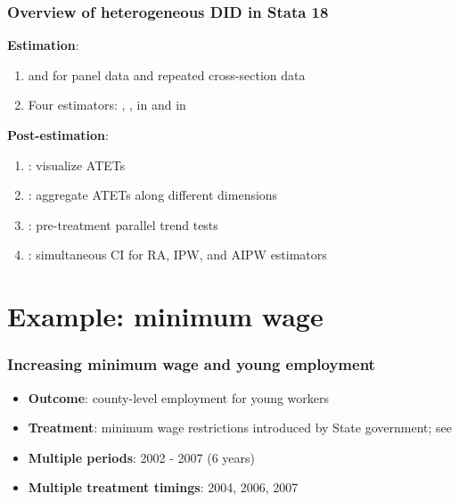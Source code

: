 \documentclass[11pt]{beamer}
\begin{document}
\begin{frame}
  \frametitle{Overview of heterogeneous DID in Stata 18}
{\bf Estimation}:
\begin{enumerate}
  \item {} and  for panel data and
    repeated cross-section data
  \item Four estimators: , ,  in
\cite{Callaway2021} and  in \cite{Wooldridge2021}
\end{enumerate}

\vskip 0.3cm
{\bf Post-estimation}:
\begin{enumerate}
  \item {}: visualize ATETs
  \item {}: aggregate ATETs along different
    dimensions
  \item {}: pre-treatment parallel trend tests
  \item {}: simultaneous CI for RA, IPW, and AIPW estimators
\end{enumerate}
\end{frame}

\section{Example: minimum wage}
\begin{frame}
  \frametitle{Increasing minimum wage and young employment}
  \vskip 0.5cm

\begin{itemize}
    \setlength\itemsep{0.5em}
  \item {\bf Outcome}: county-level employment for young workers
  \item {\bf Treatment}: minimum wage restrictions introduced by State
    government; see \cite{Callaway2021} 
  \item {\bf Multiple periods}: 2002 - 2007 (6 years)
  \item {\bf Multiple treatment timings}: 2004, 2006, 2007
\end{itemize}

\end{frame}
\end{document}
